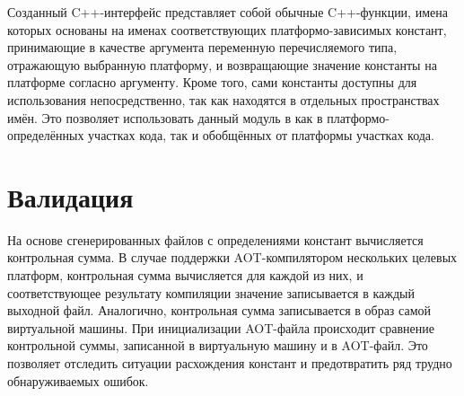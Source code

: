\par
Созданный C++-интерфейс представляет собой обычные C++-функции, имена которых основаны на именах соответствующих платформо-зависимых констант, принимающие в качестве аргумента переменную перечисляемого типа, отражающую выбранную платформу, и возвращающие значение константы на платформе согласно аргументу. Кроме того, сами константы доступны для использования непосредственно, так как находятся в отдельных пространствах имён. Это позволяет использовать данный модуль в как в платформо-определённых участках кода, так и обобщённых от платформы участках кода.

\section{Валидация}
На основе сгенерированных файлов с определениями констант вычисляется контрольная сумма.
В случае поддержки AOT-компилятором нескольких целевых платформ, контрольная сумма вычисляется для каждой из них, и соответствующее результату компиляции значение записывается в каждый выходной файл.
Аналогично, контрольная сумма записывается в образ самой виртуальной машины.
При инициализации AOT-файла происходит сравнение контрольной суммы, записанной в виртуальную машину и в AOT-файл. Это позволяет отследить ситуации расхождения констант и предотвратить ряд трудно обнаруживаемых ошибок.  

\newpage